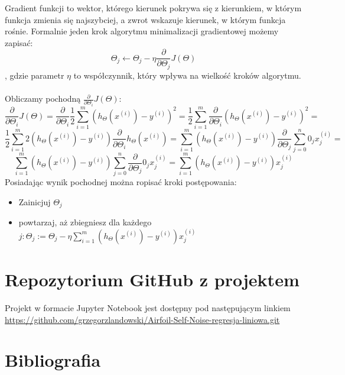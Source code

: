 \documentclass{article}
\begin{document}
Gradient funkcji to wektor, którego kierunek pokrywa się z kierunkiem, w którym funkcja zmienia się najszybciej, a zwrot wskazuje kierunek, w którym funkcja rośnie. Formalnie jeden krok algorytmu minimalizacji gradientowej możemy zapisać:
\[\Theta_j \leftarrow\Theta_j - \eta\frac{\partial}{\partial\Theta_j}J(\Theta)\]
, gdzie parametr $\eta$ to współczynnik, który wpływa na wielkość kroków algorytmu.
\\
\\
Obliczamy pochodną $\frac{\partial}{\partial\Theta_i}J(\Theta)$:
\[\frac{\partial}{\partial\Theta_i}J(\Theta) = \frac{\partial}{\partial\Theta_i}\frac{1}{2}\sum_{i=1}^m{(h_\Theta(x^{(i)}) - y^{(i)})}^2 =
\frac{1}{2}\sum_{i=1}^m\frac{\partial}{\partial\Theta_i} {(h_\Theta(x^{(i)}) - y^{(i)})}^2 =
\]
\[
\frac{1}{2}\sum_{i=1}^m2(h_\Theta(x^{(i)}) - y^{(i)})\frac{\partial}{\partial\Theta_i}h_\Theta(x^{(i)}) =
\sum_{i=1}^m(h_\Theta(x^{(i)}) - y^{(i)})\frac{\partial}{\partial\Theta_j}\sum_{j=0}^n 0_j x_j^{(i)} =
\]
\[
\sum_{i=1}^m(h_\Theta(x^{(i)}) - y^{(i)})\sum_{j=0}^n\frac{\partial}{\partial\Theta_j} 0_j x_j^{(i)} =
\sum_{i=1}^m(h_\Theta(x^{(i)}) - y^{(i)})x^{(i)}_j
\]
\newpage
Posiadając wynik pochodnej można ropisać kroki postępowania:
\begin{itemize}
  \item Zainicjuj $\Theta_j$
  \item powtarzaj, aż zbiegniesz dla każdego $j:\Theta_j:= \Theta_j - \eta \sum_{i=1}^m(h_\Theta(x^{(i)}) - y^{(i)})x^{(i)}_j$
\end{itemize}

\section{Repozytorium GitHub z projektem}
Projekt w formacie Jupyter Notebook jest dostępny pod następującym linkiem \url{https://github.com/grzegorzlandowski/Airfoil-Self-Noise-regresja-liniowa.git}




\pagebreak

\section{Bibliografia}
\newcommand{\makeboxlabel}[1]{\fbox{#1.}\hfill}%
\newenvironment{boxlabel}
  {\begin{list}
    {\arabic{boxlblcounter}}
    {\usecounter{boxlblcounter}
     \setlength{\labelwidth}{3em}
     \setlength{\labelsep}{0em}
     \setlength{\itemsep}{2pt}
     \setlength{\leftmargin}{1.5cm}
     \setlength{\rightmargin}{2cm}
     \setlength{\itemindent}{0em} 
     \let\makelabel=\makeboxlabel
    }
  }
{\end{list}}
\end{document}

